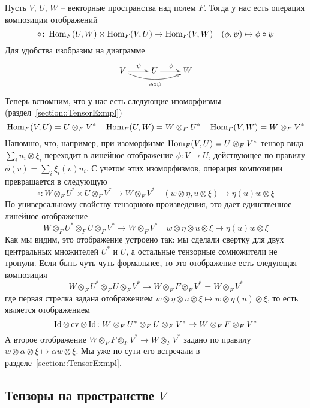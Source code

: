 Пусть $V$, $U$, $W$ -- векторные пространства над полем $F$.
Тогда у нас есть операция композиции отображений
\[
\circ \colon \operatorname{Hom}_F(U,W)\times \operatorname{Hom}_F(V, U)\to \operatorname{Hom}_F(V, W)\quad (\phi, \psi)\mapsto \phi\circ \psi
\]
Для удобства изобразим на диаграмме
\[
\xymatrix{
	{V}\ar[r]^{\psi}\ar@/_10pt/[rr]_{\phi\circ\psi}&{U}\ar[r]^{\phi}&{W}
}
\]
Теперь вспомним, что у нас есть следующие изоморфизмы (раздел~\ref{section::TensorExmpl})
\[
\operatorname{Hom}_F(V, U)= U\otimes_F V^*\quad \operatorname{Hom}_F(U, W) = W\otimes_F U^*\quad\operatorname{Hom}_F(V, W) = W\otimes_F V^*
\]
Напомню, что, например, при изоморфизме $\operatorname{Hom}_F(V, U)= U\otimes_F V^*$ тензор вида $\sum_i u_i\otimes \xi_i$ переходит в линейное отображение $\phi\colon V\to U$, действующее по правилу $\phi(v) = \sum_i \xi_i(v)u_i$.
С учетом этих изоморфизмов, операция композиции превращается в следующую
\[
\circ\colon W\otimes_F U^* \times U\otimes_F V^* \to W\otimes_F V^*\quad (w\otimes \eta, u\otimes \xi)\mapsto \eta(u) w\otimes \xi
\]
По универсальному свойству тензорного произведения, это дает единственное линейное отображение
\[
W\otimes_F U^* \otimes_F U\otimes_F V^* \to W\otimes_F V^*\quad w\otimes \eta\otimes u\otimes \xi\mapsto \eta(u) w\otimes \xi
\]
Как мы видим, это отображение устроено так: мы сделали свертку для двух центральных множителей $U^*$ и $U$, а остальные тензорные сомножители не тронули.
Если быть чуть-чуть формальнее, то это отображение есть следующая композиция
\[
W\otimes_F U^* \otimes_F U \otimes_F V^* \to W\otimes_F F\otimes_F V^* = W\otimes_F V^*
\]
где первая стрелка задана отображением $ w\otimes \eta\otimes u\otimes \xi\mapsto  w\otimes \eta(u)\otimes \xi$, то есть является отображением
\[
\operatorname{Id}\otimes \operatorname{ev}\otimes \operatorname{Id} \colon W\otimes_F U^* \otimes_F U \otimes_F V^* \to W\otimes_F F\otimes_F V^*
\]
А второе отображение $W\otimes_F F\otimes_F V^* \to W\otimes_F V^*$ задано по правилу $w\otimes \alpha \otimes \xi \mapsto \alpha w\otimes \xi$.
Мы уже по сути его встречали в разделе~\ref{section::TensorExmpl}.

\subsection{Тензоры на пространстве $V$}

